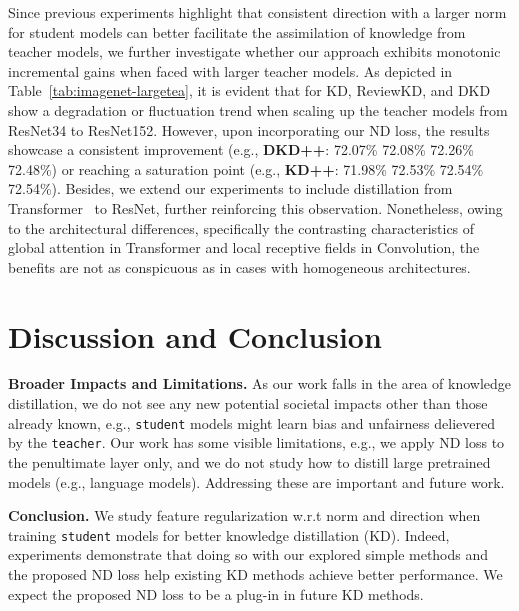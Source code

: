 \documentclass{article}
\begin{document}
Since previous experiments highlight that consistent direction with a larger norm for student models can better facilitate the assimilation of knowledge from teacher models, we further investigate whether our approach exhibits monotonic incremental gains when faced with larger teacher models. As depicted in Table~\ref{tab:imagenet-largetea}, it is evident that for KD, ReviewKD, and DKD show a degradation or fluctuation trend when scaling up the teacher models from ResNet34 to ResNet152. However, upon incorporating our ND loss, the results showcase a consistent improvement (e.g., \textbf{DKD++}: 72.07\%  72.08\%  72.26\%  72.48\%) or reaching a saturation point (e.g., \textbf{KD++}: 71.98\%  72.53\%  72.54\%  72.54\%). Besides, we extend our experiments to include distillation from Transformer~\cite{dosovitskiy2020image} to ResNet, further reinforcing this observation. Nonetheless, owing to the architectural differences, specifically the contrasting characteristics of global attention in Transformer and local receptive fields in Convolution, the benefits are not as conspicuous as in cases with homogeneous architectures.





%
 













\section{Discussion and Conclusion}

{\bf Broader Impacts and Limitations.}
As our work falls in the area of knowledge distillation, 
we do not see any new potential societal impacts other than those already known, e.g., {\tt student} models might learn bias and unfairness delievered by the {\tt teacher}.
Our work has some visible limitations, e.g., we apply ND loss to the penultimate layer only, and we do not study how to distill large pretrained models (e.g., language models).
Addressing these are important and  future work.

{\bf Conclusion.}
We study feature regularization w.r.t norm and direction when training {\tt student} models for better knowledge distillation (KD).
Indeed, experiments demonstrate that doing so with our explored simple methods and the proposed ND loss help existing KD methods achieve better performance.
We expect the proposed ND loss to be a plug-in in future KD methods.
\end{document}
